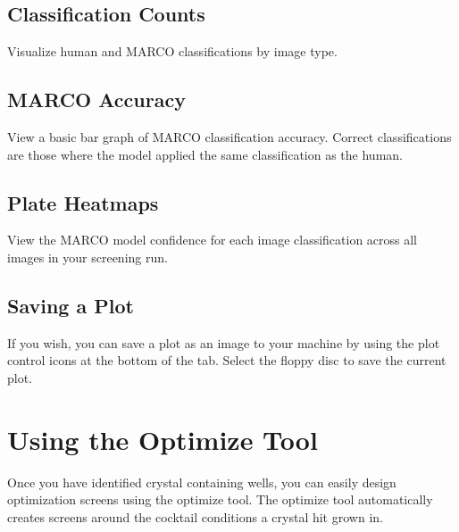 \documentclass[letterpaper,10pt,english]{sphinxmanual}
\begin{document}
\subsection{Classification Counts}
\label{\detokenize{user_guide:classification-counts}}
Visualize human and MARCO classifications by image type.
\begin{quote}

\noindent{}
\end{quote}


\subsection{MARCO Accuracy}
\label{\detokenize{user_guide:marco-accuracy}}
View a basic bar graph of MARCO classification accuracy. Correct classifications
are those where the model applied the same classification as the human.
\begin{quote}

\noindent{}
\end{quote}


\subsection{Plate Heatmaps}
\label{\detokenize{user_guide:plate-heatmaps}}
View the MARCO model confidence for each image classification across
all images in your screening run.
\begin{quote}

\noindent{}
\end{quote}


\subsection{Saving a Plot}
\label{\detokenize{user_guide:saving-a-plot}}
If you wish, you can save a plot as an image to your machine by
using the plot control icons at the bottom of the  tab. Select the
floppy disc to save the current plot.


\section{Using the Optimize Tool}
\label{\detokenize{user_guide:using-the-optimize-tool}}
Once you have identified crystal containing wells, you can easily
design optimization screens using the optimize tool. The optimize tool
automatically creates screens around the cocktail conditions a crystal hit
grown in.
\end{document}
